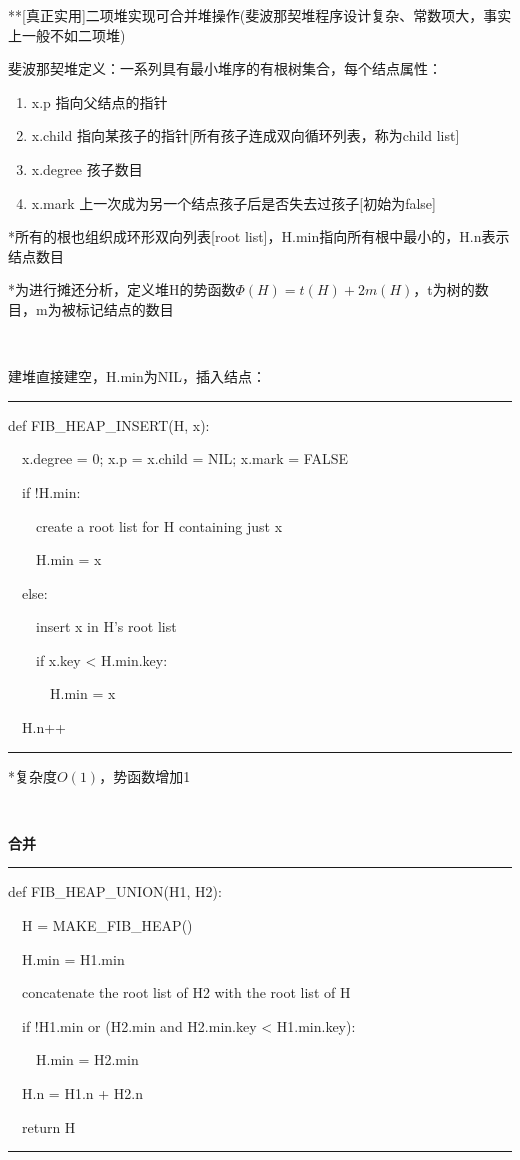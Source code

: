\documentclass[a4paper,UTF8,fontset=windows]{ctexart}
\newenvironment{code}{\rule{36em}{0.1em}\setlength{\parindent}{1em}

}{

\setlength{\parindent}{0em}\rule{36em}{0.1em}}
\begin{document}
**\hspace{0em}[真正实用]二项堆实现可合并堆操作(斐波那契堆程序设计复杂、常数项大，事实上一般不如二项堆)

斐波那契堆定义：一系列具有最小堆序的有根树集合，每个结点属性：

\begin{enumerate}
    \item x.p 指向父结点的指针
    \item x.child 指向某孩子的指针[所有孩子连成双向循环列表，称为child list]
    \item x.degree 孩子数目
    \item x.mark 上一次成为另一个结点孩子后是否失去过孩子[初始为false]
\end{enumerate}

*\hspace{0em}所有的根也组织成环形双向列表[root list]，H.min指向所有根中最小的，H.n表示结点数目

*\hspace{0em}为进行摊还分析，定义堆H的势函数$\Phi(H)=t(H)+2m(H)$，t为树的数目，m为被标记结点的数目

\

建堆直接建空，H.min为NIL，插入结点：

\begin{code}
def FIB\_HEAP\_INSERT(H, x):

\ \ x.degree = 0; x.p = x.child = NIL; x.mark = FALSE

\ \ if !H.min:

\ \ \ \ create a root list for H containing just x

\ \ \ \ H.min = x

\ \ else:

\ \ \ \ insert x in H's root list

\ \ \ \ if x.key < H.min.key:

\ \ \ \ \ \ H.min = x

\ \ H.n++
\end{code}

*\hspace{0em}复杂度$O(1)$，势函数增加1

\

\textbf{合并}

\begin{code}
def FIB\_HEAP\_UNION(H1, H2):

\ \ H = MAKE\_FIB\_HEAP()

\ \ H.min = H1.min

\ \ concatenate the root list of H2 with the root list of H

\ \ if !H1.min or (H2.min and H2.min.key < H1.min.key):

\ \ \ \ H.min = H2.min

\ \ H.n = H1.n + H2.n

\ \ return H
\end{code}
\end{document}
